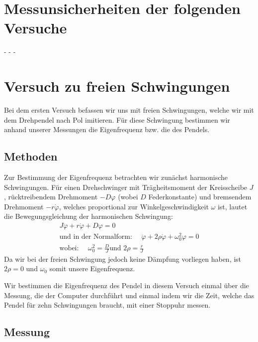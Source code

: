 \documentclass[11pt,a4paper,titlepage, ngerman]{article}
\begin{document}
	\section{Messunsicherheiten der folgenden Versuche}
		
		- - -
	
	\section{Versuch zu freien Schwingungen}
		
		Bei dem ersten Versuch befassen wir uns mit freien Schwingungen, welche wir mit dem Drehpendel nach Pol imitieren. Für diese Schwingung bestimmen wir anhand unserer Messungen die Eigenfrequenz bzw. die des Pendels.
		
		\subsection*{Methoden}
			
			Zur Bestimmung der Eigenfrequenz betrachten wir zunächst harmonische Schwingungen.					
			Für einen Drehschwinger mit Trägheitsmoment der Kreisscheibe $J$, rücktreibendem Drehmoment $-D\varphi$ (wobei $D$ Federkonstante) und bremsendem Drehmoment $-r\dot{\varphi}$, welches proportional zur Winkelgeschwindigkeit $\omega$ ist, lautet die Bewegungsgleichung der harmonischen Schwingung:
			\begin{align} 
				J\ddot{\varphi}+r\dot{\varphi}+D\varphi=0 \\
				\text{und in der Normalform: } \quad  \ddot{\varphi}+2\rho\dot{\varphi}+\omega_0^2\varphi=0 \label{eq:HarmonischeSchwingung}\\
				\text{wobei: } \quad  \omega_0^2 = \frac{D}{J} \text{und } 2\rho = \frac{r}{J}
			\end{align} 
			Da wir bei der freien Schwingung jedoch keine Dämpfung vorliegen haben, ist $2\rho = 0$ und $\omega_0$ somit unsere Eigenfrequenz.
			
			Wir bestimmen die Eigenfrequenz des Pendel in diesem Versuch einmal über die Messung, die der Computer durchführt und einmal indem wir die Zeit, welche das Pendel für zehn Schwingungen braucht, mit einer Stoppuhr messen.
		
		\subsection*{Messung}
			
\end{document}
